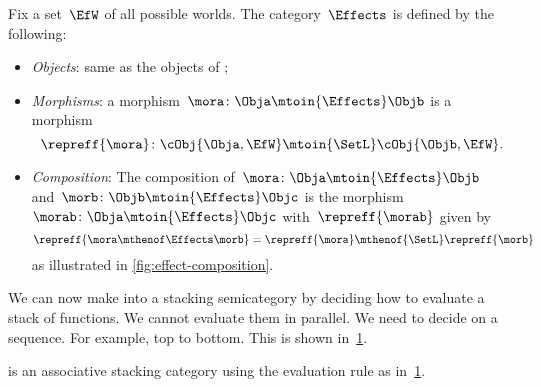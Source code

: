 \begin{definition}
    Fix a set~$\EfW$ of all possible worlds.
    The category~$\Effects$ is defined by the following:
    \begin{itemize}
        \item \emph{Objects}: same as the objects of \SetL;
        \item \emph{Morphisms}: a morphism~$\mora\colon \Obja \mtoin{\Effects} \Objb$ is a morphism
              \begin{equation}
                  \repreff{\mora}\colon \cObj{\Obja, \EfW} \mtoin{\SetL} \cObj{\Objb, \EfW}.
              \end{equation}
        \item \emph{Composition}: The composition of~$\mora\colon \Obja \mtoin{\Effects} \Objb$ and~$\morb\colon \Objb \mtoin{\Effects} \Objc$ is the morphism~$\morab\colon \Obja \mtoin{\Effects} \Objc$ with~$\repreff{\morab}$ given by
              \begin{equation}
                  \repreff{\mora \mthenof \Effects \morb}
                  = \repreff{\mora} \mthenof{\SetL} \repreff{\morb}
              \end{equation}
              as illustrated in \cref{fig:effect-composition}.
    \end{itemize}
\end{definition}

We can now make \Effects into a stacking semicategory by deciding how to evaluate a stack of functions.
We cannot evaluate them in parallel.
We need to decide on a sequence.
For example, top to bottom.
This is shown in~\cref{fig:effect-stacking}.

\begin{lemma}
    \label{lem:effects-is-stacking}
    \Effects is an associative stacking category using the evaluation rule as in~\cref{fig:effect-stacking}.
\end{lemma}

\begin{figure}[h!]
    \centering
    \caption{}
    \label{fig:effect-stacking}
\end{figure}

